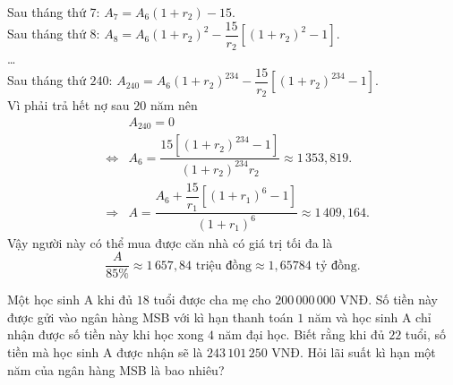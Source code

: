 \begin{ex}
{		Sau tháng thứ  7: $A_7=A_6 \left(1+r_2 \right)-15$.\\
		Sau tháng thứ 8:  $A_8=A_6 \left(1+r_2 \right)^2-\dfrac{15}{r_2} \left[(1+r_2)^2-1\right]$.\\
		 {\dots}\\
		Sau tháng thứ $240$: $A_{240}=A_6  \left(1+r_2 \right)^{234}-\dfrac{15}{r_2} \left[(1+r_2)^{234}-1\right]$.\\
		Vì phải trả  hết nợ sau $20$ năm nên
		\allowdisplaybreaks 
		\begin{eqnarray*}
			 &&A_{240}=0\\
			&\Leftrightarrow& A_6=\dfrac{15\left[(1+r_2)^{234}-1\right]}{\left(1+r_2 \right)^{234}  r_2} \approx 1\,353,819.\\
			&\Rightarrow& A=\dfrac{A_6+\dfrac{15}{r_1} \left[(1+r_1)^6-1\right]}{\left(1+r_1 \right)^6}  \approx 1\,409{,}164.
		\end{eqnarray*}
		Vậy người này có thể  mua được căn nhà có giá trị tối đa là
		\[\dfrac{A}{85\%} \approx 1\,657{,}84 \text{ triệu đồng} \approx 1{,}65784\text{  tỷ đồng}.\]
	} 
\end{ex}

\begin{ex}%
	Một học sinh A khi đủ $18$ tuổi được cha mẹ cho $200\,000\,000$ VNĐ. Số tiền này được gửi  vào ngân hàng MSB với kì hạn thanh toán $1$ năm và học sinh A chỉ nhận được số tiền này khi học xong $4$ năm đại học. Biết rằng khi đủ $22$ tuổi, số tiền mà học sinh A được nhận sẽ là $243\,101\,250$ VNĐ. Hỏi lãi suất kì hạn một năm của ngân hàng MSB là bao nhiêu?
\end{ex}

